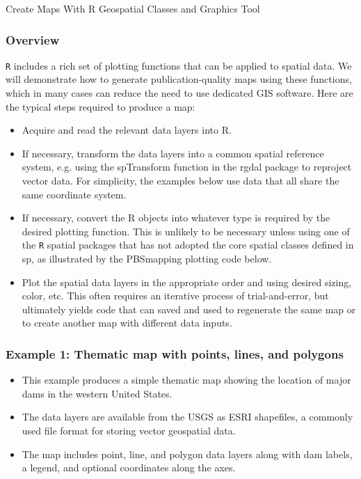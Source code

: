 \documentclass{beamer}
\begin{document}
\begin{frame}[fragile]
\huge
Create Maps With R Geospatial Classes and Graphics Tool

\end{frame}
\begin{frame}[fragile]
\frametitle{Overview}
\texttt{R} includes a rich set of plotting functions that can be applied to spatial data. We will demonstrate how to generate publication-quality maps using these functions, which in many cases can reduce the need to use dedicated GIS software. Here are the typical steps required to produce a map:
\begin{itemize}
\item Acquire and read the relevant data layers into R.
\item  If necessary, transform the data layers into a common spatial reference system, e.g. using the spTransform function in the rgdal package to reproject vector data. For simplicity, the examples below use data that all share the same coordinate system.
\item  If necessary, convert the R objects into whatever type is required by the desired plotting function. This is unlikely to be necessary unless using one of the \texttt{R} spatial packages that has not adopted the core spatial classes defined in sp, as illustrated by the PBSmapping plotting code below.
\item  Plot the spatial data layers in the appropriate order and using desired sizing, color, etc. This often requires an iterative process of trial-and-error, but ultimately yields code that can saved and used to regenerate the same map or to create another map with different data inputs.
\end{itemize}
\end{frame}
\begin{frame}
\frametitle{Example 1: Thematic map with points, lines, and polygons}
\begin{itemize}
\item This example produces a simple thematic map showing the location of major dams in the western United States. 
\item The data layers are available from the USGS as ESRI shapefiles, a commonly used file format for storing vector geospatial data.
\item  The map includes point, line, and polygon data layers along with dam labels, a legend, and optional coordinates along the axes.
\end{itemize}
\end{frame}
\end{document}
